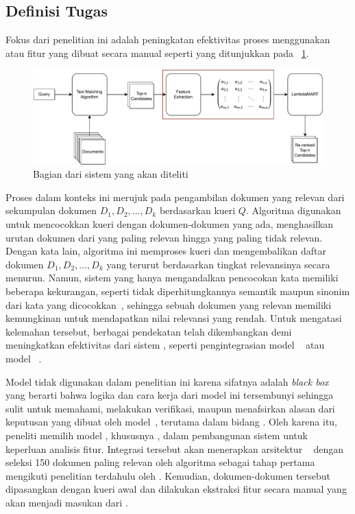 \subsection{Definisi Tugas}
\label{subbab:3:Definisi Tugas}
Fokus dari penelitian ini adalah peningkatan efektivitas proses \retrieval{} menggunakan \hcf{} atau fitur yang dibuat secara manual seperti yang ditunjukkan pada \gambar{}~\ref{fig:posisiPenelitian}.
\begin{figure}[!ht]
    \centering
    \includegraphics[scale=0.65]{assets/pdfs/PosisiPenelitian.pdf}
    \caption{Bagian dari sistem \ir{} yang akan diteliti}
    \label{fig:posisiPenelitian}
\end{figure}
Proses \retrieval{} dalam konteks ini merujuk pada pengambilan dokumen yang relevan dari sekumpulan dokumen \(D_1,D_2,...,D_k\) berdasarkan kueri \(Q\). Algoritma \txt{} \matching{} digunakan untuk mencocokkan kueri dengan dokumen-dokumen yang ada, menghasilkan urutan dokumen dari yang paling relevan hingga yang paling tidak relevan. Dengan kata lain, algoritma ini memproses kueri dan mengembalikan daftar dokumen \(D_1,D_2,...,D_k\) yang terurut berdasarkan tingkat relevansinya secara menurun. Namun, sistem \ir{} yang hanya mengandalkan pencocokan kata memiliki beberapa kekurangan, seperti tidak diperhitungkannya semantik maupun sinonim dari kata yang dicocokkan~\citep{hambarde2023information}, sehingga sebuah dokumen yang relevan memiliki kemungkinan untuk mendapatkan nilai relevansi yang rendah. Untuk mengatasi kelemahan tersebut, berbagai pendekatan telah dikembangkan demi meningkatkan efektivitas dari sistem \ir{}, seperti pengintegrasian model \ml{}~\citep{burges2010ranknet} atau model \nn{}~\citep{1223700}.

Model \nn{} tidak digunakan dalam penelitian ini karena sifatnya adalah \textit{black box} yang berarti bahwa logika dan cara kerja dari model ini tersembunyi sehingga sulit untuk memahami, melakukan verifikasi, maupun menafsirkan alasan dari keputusan yang dibuat oleh model~\citep{electronics8080832}, terutama dalam bidang \ir{}. Oleh karena itu, peneliti memilih model \ml{}, khususnya \lambdamart{}, dalam pembangunan sistem \ir{} untuk keperluan analisis fitur. Integrasi tersebut akan menerapkan arsitektur \cascaded{}~\citep{wang2011cascade} dengan seleksi 150 dokumen paling relevan oleh algoritma \txt{} \matching{} sebagai tahap pertama mengikuti penelitian terdahulu oleh \citet{nguyen2024captain}. Kemudian, dokumen-dokumen tersebut dipasangkan dengan kueri awal dan dilakukan ekstraksi fitur secara manual yang akan menjadi masukan dari \lambdamart{}. 
